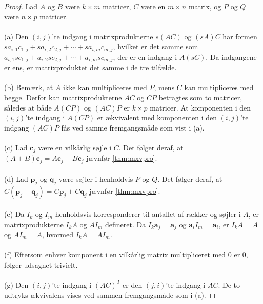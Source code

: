 \begin{proof}
Lad $A$ og $B$ være $k \times m$ matricer, $C$ være en $m \times n$ matrix, og $P$ og $Q$ være $n \times p$ matricer. 
\\\\
(a) Den $(i,j)$'te indgang i matrixprodukterne $s(AC)$ og $(sA)C$ har formen $sa_{i,1}c_{1,j} + sa_{i,2}c_{2,j} + \cdots + sa_{i,m}c_{m,j}$, hvilket er det samme som $a_{i,1}sc_{1,j} + a_{i,2}sc_{2,j} + \cdots + a_{i,m}sc_{m,j}$, der er en indgang i $A(sC)$. 
Da indgangene er ens, er matrixproduktet det samme i de tre tilfælde.
\\\\
(b) Bemærk, at $A$ ikke kan multipliceres med $P$, mens $C$ kan multipliceres med begge. 
Derfor kan matrixprodukterne $AC$ og $CP$ betragtes som to matricer, således at både $A(CP)$ og $(AC)P$ er $k \times p$ matricer. 
At komponenten i den $(i,j)$'te indgang i $A(CP)$ er ækvivalent med komponenten i den $(i,j)$'te indgang $(AC)P$ fås ved samme fremgangsmåde som vist i (a). 
\\\\
(c) Lad $\textbf{c}_j$ være en vilkårlig søjle i $C$. 
Det følger deraf, at $(A+B)\textbf{c}_j=A\textbf{c}_j+B\textbf{c}_j$ jævnfør \ref{thm:mxvpro}. 
\\\\
(d) Lad $\textbf{p}_j$ og $\textbf{q}_j$ være søjler i henholdvis $P$ og $Q$. Det følger deraf, at $C(\textbf{p}_j+\textbf{q}_j)=C\textbf{p}_j+C\textbf{q}_j$ jævnfør \ref{thm:mxvpro}. 
\\\\
(e) Da $I_k$ og $I_m$ henholdsvis korresponderer til antallet af rækker og søjler i $A$, er matrixprodukterne $I_kA$ og $AI_m$ defineret. 
Da $I_k\textbf{a}_j=\textbf{a}_j$ og $\textbf{a}_iI_m=\textbf{a}_i$, er $I_kA=A$ og $AI_m=A$, hvormed $I_kA=AI_m$.
\\\\
(f) Eftersom enhver komponent i en vilkårlig matrix multipliceret med $0$ er $0$, følger udsagnet trivielt. 
\\\\
(g) Den $(i,j)$'te indgang i $(AC)^T$ er den $(j,i)$'te indgang i $AC$. De to udtryks ækvivalens vises ved sammen fremgangsmåde som i (a).
\end{proof}